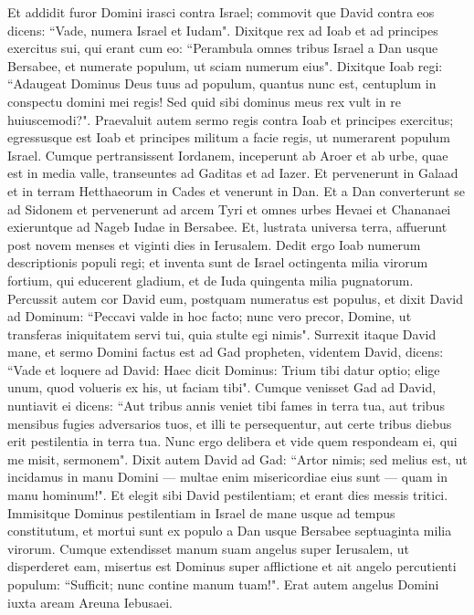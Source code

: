 \begin{biblechapter}  
\verse Et addidit furor Domini irasci contra Israel; commovit que David contra eos dicens: “Vade, numera Israel et Iudam". 
\verse Dixitque rex ad Ioab et ad principes exercitus sui, qui erant cum eo: “Perambula omnes tribus Israel a Dan usque Bersabee, et numerate populum, ut sciam numerum eius". 
\verse Dixitque Ioab regi: “Adaugeat Dominus Deus tuus ad populum, quantus nunc est, centuplum in conspectu domini mei regis! Sed quid sibi dominus meus rex vult in re huiuscemodi?". 
\verse Praevaluit autem sermo regis contra Ioab et principes exercitus; egressusque est Ioab et principes militum a facie regis, ut numerarent populum Israel. 
\verse Cumque pertransissent Iordanem, inceperunt ab Aroer et ab urbe, quae est in media valle, transeuntes ad Gaditas et ad Iazer. 
\verse Et pervenerunt in Galaad et in terram Hetthaeorum in Cades et venerunt in Dan. Et a Dan converterunt se ad Sidonem 
\verse et pervenerunt ad arcem Tyri et omnes urbes Hevaei et Chananaei exieruntque ad Nageb Iudae in Bersabee. 
\verse Et, lustrata universa terra, affuerunt post novem menses et viginti dies in Ierusalem. 
\verse Dedit ergo Ioab numerum descriptionis populi regi; et inventa sunt de Israel octingenta milia virorum fortium, qui educerent gladium, et de Iuda quingenta milia pugnatorum. 
\verse Percussit autem cor David eum, postquam numeratus est populus, et dixit David ad Dominum: “Peccavi valde in hoc facto; nunc vero precor, Domine, ut transferas iniquitatem servi tui, quia stulte egi nimis". 
\verse Surrexit itaque David mane, et sermo Domini factus est ad Gad propheten, videntem David, dicens: 
\verse “Vade et loquere ad David: Haec dicit Dominus: Trium tibi datur optio; elige unum, quod volueris ex his, ut faciam tibi". 
\verse Cumque venisset Gad ad David, nuntiavit ei dicens: “Aut tribus annis veniet tibi fames in terra tua, aut tribus mensibus fugies adversarios tuos, et illi te persequentur, aut certe tribus diebus erit pestilentia in terra tua. Nunc ergo delibera et vide quem respondeam ei, qui me misit, sermonem". 
\verse Dixit autem David ad Gad: “Artor nimis; sed melius est, ut incidamus in manu Domini — multae enim misericordiae eius sunt — quam in manu hominum!". 
\verse Et elegit sibi David pestilentiam; et erant dies messis tritici. Immisitque Dominus pestilentiam in Israel de mane usque ad tempus constitutum, et mortui sunt ex populo a Dan usque Bersabee septuaginta milia virorum. 
\verse Cumque extendisset manum suam angelus super Ierusalem, ut disperderet eam, misertus est Dominus super afflictione et ait angelo percutienti populum: “Sufficit; nunc contine manum tuam!". Erat autem angelus Domini iuxta aream Areuna Iebusaei. 

\end{biblechapter}
